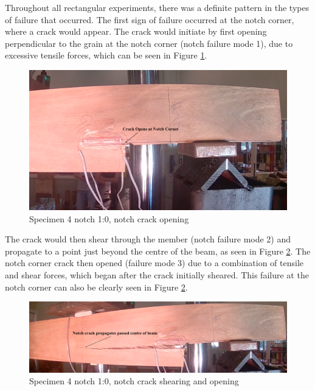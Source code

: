 \documentclass[11pt,a4paper]{article}
\numberwithin{equation}{subsection}
\begin{document}
\vspace*{\baselineskip}

\noindent
Throughout all rectangular experiments, there was a definite pattern in the types of failure that occurred. The first sign of failure occurred at the notch corner, where a crack would appear. The crack would initiate by first opening perpendicular to the grain at the notch corner (notch failure mode 1), due to excessive tensile forces, which can be seen in Figure \ref{fig:Rect_Crack}. 

\vspace*{\baselineskip}

\begin{figure}[h]
	\begin{center}
		\includegraphics[scale=0.5]{Rect_Crack_Open}
	\end{center}
	\caption{Specimen 4 notch 1:0, notch crack opening}
	\label{fig:Rect_Crack}
\end{figure}
\pagebreak

\noindent
The crack would then shear through the member (notch failure mode 2) and propagate to a point just beyond the centre of the beam, as seen in Figure \ref{fig:Rect_Prop}. The notch corner crack then opened (failure mode 3) due to a combination of tensile and shear forces, which began after the crack initially sheared. This failure at the notch corner can also be clearly seen in Figure \ref{fig:Rect_Prop}.  

\vspace*{\baselineskip}

\begin{figure}[h]
	\begin{center}
		\includegraphics[scale=0.31]{Rect_propegate}
	\end{center}
	\caption{Specimen 4 notch 1:0, notch crack shearing and opening}
	\label{fig:Rect_Prop}
\end{figure}
\pagebreak
\end{document}
